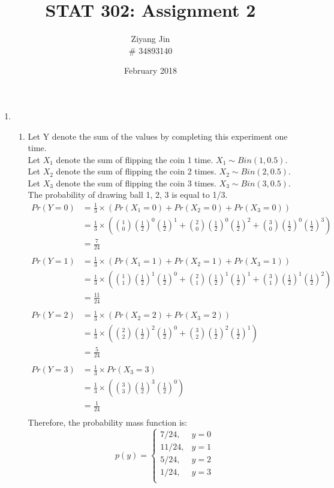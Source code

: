 \documentclass[11pt]{article}
\title{STAT 302: Assignment 2}
\author{Ziyang Jin \\
\# 34893140}
\date{February 2018}
\begin{document}
\maketitle

\begin{enumerate}[label=\textbf{Question \arabic*:},start=1]

\item 
\begin{enumerate}
\item Let Y denote the sum of the values by completing this experiment one time.\\
Let \(X_1\) denote the sum of flipping the coin 1 time. \( X_1 \sim Bin(1, 0.5).\) \\
Let \(X_2\) denote the sum of flipping the coin 2 times. \( X_2 \sim Bin(2, 0.5).\) \\
Let \(X_3\) denote the sum of flipping the coin 3 times. \( X_3 \sim Bin(3, 0.5).\) \\
The probability of drawing ball 1, 2, 3 is equal to 1/3.\\
\begin{equation}
\begin{split}
Pr(Y=0) & = \frac{1}{3} \times (Pr(X_1 = 0) + Pr(X_2 = 0) + Pr(X_3 = 0)) \\
& = \frac{1}{3} \times ({1 \choose 0}(\frac{1}{2})^0(\frac{1}{2})^1 + {2 \choose 0}(\frac{1}{2})^0(\frac{1}{2})^2 + {3 \choose 0}(\frac{1}{2})^0(\frac{1}{2})^3) \\
& = \frac{7}{24} \\
\\
Pr(Y=1) & = \frac{1}{3} \times (Pr(X_1 = 1) + Pr(X_2 = 1) + Pr(X_3 = 1)) \\
& = \frac{1}{3} \times ({1 \choose 1}(\frac{1}{2})^1(\frac{1}{2})^0 + {2 \choose 1}(\frac{1}{2})^1(\frac{1}{2})^1 + {3 \choose 1}(\frac{1}{2})^1(\frac{1}{2})^2) \\
& = \frac{11}{24} \\
\\
Pr(Y=2) & = \frac{1}{3} \times (Pr(X_2 = 2) + Pr(X_3 = 2)) \\
& = \frac{1}{3} \times ({2 \choose 2}(\frac{1}{2})^2(\frac{1}{2})^0 + {3 \choose 2}(\frac{1}{2})^2(\frac{1}{2})^1) \\
& = \frac{5}{24} \\
\\
Pr(Y=3) & = \frac{1}{3} \times Pr(X_3 = 3) \\
& = \frac{1}{3} \times ({3 \choose 3}(\frac{1}{2})^3(\frac{1}{2})^0) \\
& = \frac{1}{24} \\
\end{split}
\end{equation}
Therefore, the probability mass function is:
  \[
    p(y) = \begin{cases}
        7/24, & y = 0\\
        11/24, & y = 1\\
        5/24, & y = 2\\
        1/24 , & y = 3\\
        \end{cases}
  \]


\end{enumerate}
\end{enumerate}
\end{document}
